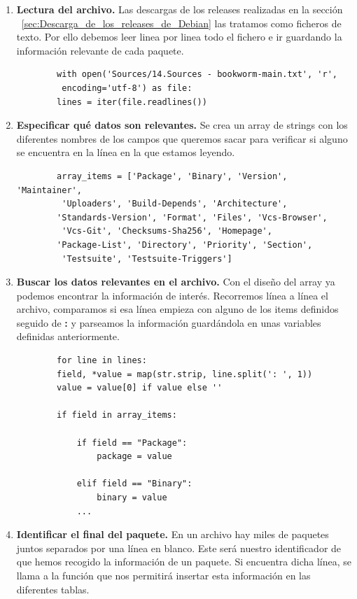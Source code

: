 \documentclass[a4paper, 12pt]{book}
\begin{document}
\begin{enumerate}
	\item \textbf{Lectura del archivo.} Las descargas de los releases realizadas en la sección  ~\ref{sec:Descarga_de_los_releases_de_Debian} las tratamos como ficheros de texto. Por ello debemos leer linea por linea todo el fichero e ir guardando la información relevante de cada paquete.
	
	\begin{verbatim}
		with open('Sources/14.Sources - bookworm-main.txt', 'r',
		 encoding='utf-8') as file:
		lines = iter(file.readlines())
	\end{verbatim}
	
	\item \textbf{Especificar qué datos son relevantes.} Se crea un array de strings con los diferentes nombres de los campos que queremos sacar para verificar si alguno se encuentra en la línea en la que estamos leyendo.
	
	\begin{verbatim}
		array_items = ['Package', 'Binary', 'Version', 'Maintainer',
		 'Uploaders', 'Build-Depends', 'Architecture',
		'Standards-Version', 'Format', 'Files', 'Vcs-Browser',
		 'Vcs-Git', 'Checksums-Sha256', 'Homepage',
		'Package-List', 'Directory', 'Priority', 'Section',
		 'Testsuite', 'Testsuite-Triggers']
	\end{verbatim}
	
	\item \textbf{Buscar los datos relevantes en el archivo.} Con el diseño del array ya podemos encontrar la información de interés. Recorremos línea a línea el archivo, comparamos si esa línea empieza con alguno de los items definidos seguido de \textbf{:} y parseamos la información guardándola en unas variables definidas anteriormente.
	
	\begin{verbatim}
		for line in lines:
		field, *value = map(str.strip, line.split(': ', 1))
		value = value[0] if value else ''
		
		if field in array_items:
	
			if field == "Package":
				package = value
			
			elif field == "Binary":
				binary = value
			...
	\end{verbatim}
	
		\item \textbf{Identificar el final del paquete.} En un archivo hay miles de paquetes juntos separados por una línea en blanco. Este será nuestro identificador de que hemos recogido la información de un paquete. Si encuentra dicha línea, se llama a la función que nos permitirá insertar esta información en las diferentes tablas.
		

\end{enumerate}
\end{document}
